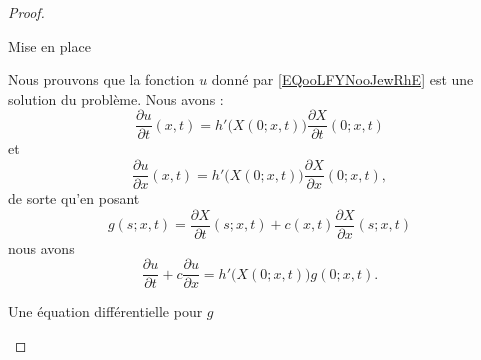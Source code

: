 \begin{proof}
\begin{subproof}
		\begin{subproof}
			\item[Mise en place]

			Nous prouvons que la fonction \( u\) donné par \eqref{EQooLFYNooJewRhE} est une solution du problème. Nous avons :
			\begin{equation}
				\frac{ \partial u }{ \partial t }(x,t)=h'\big( X(0;x,t) \big)\frac{ \partial X }{ \partial t }(0;x,t)
			\end{equation}
			et
			\begin{equation}
				\frac{ \partial u }{ \partial x }(x,t)=h'\big( X(0;x,t) \big)\frac{ \partial X }{ \partial x }(0;x,t),
			\end{equation}
			de sorte qu'en posant
			\begin{equation}
				g(s;x,t)=\frac{ \partial X }{ \partial t }(s;x,t)+c(x,t)\frac{ \partial X }{ \partial x }(s;x,t)
			\end{equation}
			nous avons
			\begin{equation}
				\frac{ \partial u }{ \partial t }+c\frac{ \partial u }{ \partial x }=h'\big( X(0;x,t) \big)g(0;x,t).
			\end{equation}

			\item[Une équation différentielle pour \( g\)]


\end{subproof}
\end{subproof}
\end{proof}
